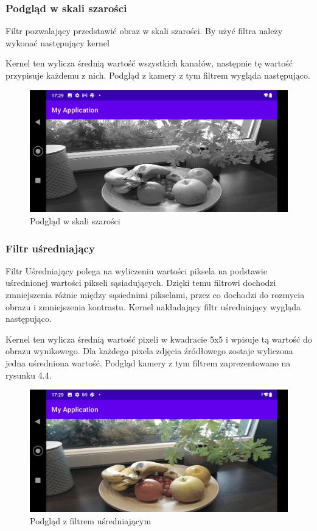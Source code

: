 \subsubsection[Podgląd w skali szarości]{Podgląd w skali szarości}
Filtr pozwalający przedstawić obraz w skali szarości. By użyć filtra należy wykonać następujący kernel

Kernel ten wylicza średnią wartość wszystkich kanałów, następnie tę wartość przypisuje każdemu z nich. Podgląd z kamery z tym filtrem wygląda następująco.
\begin{figure}[H]
	\includegraphics[scale=0.16]{imgs/BlackWhite.png}
	\caption{Podgląd w skali szarości}
\end{figure}
\subsubsection[Filtr uśredniający]{Filtr uśredniający}
Filtr Uśredniający polega na wyliczeniu wartości piksela na podstawie uśrednionej wartości pikseli sąsiadujących. Dzięki temu filtrowi dochodzi zmniejszenia różnic między sąsiednimi pikselami, przez co dochodzi do rozmycia obrazu i zmniejszenia kontrastu. Kernel nakładający filtr uśredniający wygląda następująco.

Kernel ten wylicza średnią wartość pixeli w kwadracie 5x5 i wpisuje tą wartość do obrazu wynikowego. Dla każdego pixela zdjęcia źródłowego zostaje wyliczona jedna uśredniona wartość. Podgląd kamery z tym filtrem zaprezentowano na rysunku 4.4.
\begin{figure}[H]
	\includegraphics[scale=0.16]{imgs/avgFilter.png}
	\caption{Podgląd z filtrem uśredniającym}
\end{figure}
